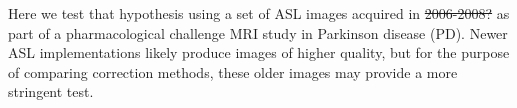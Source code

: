 Here we test that hypothesis using a set of ASL images acquired in \sout{2006-2008?} as part of a pharmacological challenge MRI study in Parkinson disease (PD).\cite{Black_2010} Newer ASL implementations likely produce images of higher quality, but for the purpose of comparing correction methods, these older images may provide a more stringent test.